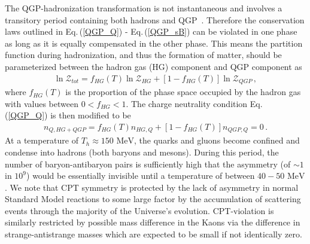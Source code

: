 \documentclass[universe,article,submit,moreauthors,pdftex,a4paper]{Definitions/mdpi}
\newcommand{\MeV}{\text{ MeV}}
\newcommand{\req}[1]{Eq.\,(\ref{#1})}
\begin{document}
The QGP-hadronization transformation is not instantaneous and involves a transitory period containing both hadrons and QGP~\cite{Rafelski:2019twp}. Therefore the conservation laws outlined in \req{QGP_Q} - \req{QGP_sB} can be violated in one phase as long as it is equally compensated in the other phase. This means the partition function during hadronization, and thus the formation of matter, should be parameterized between the hadron gas (HG) component and QGP component as
\begin{align}\label{QGP_trans}
 \ln\mathcal{Z}_{tot}=f_{HG}(T)\ln\mathcal{Z}_{HG}+\left[1-f_{HG}(T)\right]\ln\mathcal{Z}_{QGP}\,,
\end{align}
where $f_{HG}(T)$ is the proportion of the phase space occupied by the hadron gas with values between $0<f_{HG}<1$. The charge neutrality condition \req{QGP_Q} is then modified to be
\begin{align}\label{QGP_transQ}
 n_{Q,HG+QGP}=f_{HG}(T)n_{HG,Q}+\left[1-f_{HG}(T)\right]n_{QGP,Q}=0\,.
\end{align}
At a temperature of $T_{h}\approx150\MeV$, the quarks and gluons become confined and condense into hadrons (both baryons and mesons). During this period, the number of baryon-antibaryon pairs is sufficiently high that the asymmetry (of $\sim1$ in $10^{9}$) would be essentially invisible until a temperature of between $40-50\MeV$. We note that CPT symmetry is protected by the lack of asymmetry in normal Standard Model reactions to some large factor by the accumulation of scattering events through the majority of the Universe's evolution. CPT-violation is similarly restricted by possible mass difference in the Kaons via the difference in strange-antistrange masses which are expected to be small if not identically zero.
\end{document}
